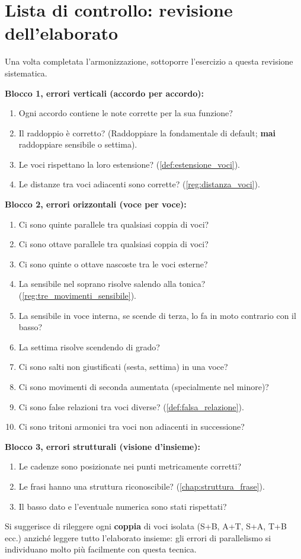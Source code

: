 \section{Lista di controllo: revisione dell'elaborato}

\begin{regola}
\label{reg:checklist_errori}
Una volta completata l'armonizzazione, sottoporre l'esercizio a questa revisione sistematica.

\textbf{Blocco 1, errori verticali (accordo per accordo):}
\begin{enumerate}
	\item Ogni accordo contiene le note corrette per la sua funzione?
	\item Il raddoppio è corretto? (Raddoppiare la fondamentale di default; \textbf{mai} raddoppiare sensibile o settima).
	\item Le voci rispettano la loro estensione? (\ref{def:estensione_voci}).
	\item Le distanze tra voci adiacenti sono corrette? (\ref{reg:distanza_voci}).
\end{enumerate}

\textbf{Blocco 2, errori orizzontali (voce per voce):}
\begin{enumerate}
	\item Ci sono quinte parallele tra qualsiasi coppia di voci?
	\item Ci sono ottave parallele tra qualsiasi coppia di voci?
	\item Ci sono quinte o ottave nascoste tra le voci esterne?
	\item La sensibile nel soprano risolve salendo alla tonica? (\ref{reg:tre_movimenti_sensibile}).
	\item La sensibile in voce interna, se scende di terza, lo fa in moto contrario con il basso?
	\item La settima risolve scendendo di grado?
	\item Ci sono salti non giustificati (sesta, settima) in una voce?
	\item Ci sono movimenti di seconda aumentata (specialmente nel minore)?
	\item Ci sono false relazioni tra voci diverse? (\ref{def:falsa_relazione}).
	\item Ci sono tritoni armonici tra voci non adiacenti in successione?
\end{enumerate}

\textbf{Blocco 3, errori strutturali (visione d'insieme):}
\begin{enumerate}
	\item Le cadenze sono posizionate nei punti metricamente corretti?
	\item Le frasi hanno una struttura riconoscibile? (\ref{chap:struttura_frase}).
	\item Il basso dato e l'eventuale numerica sono stati rispettati?
\end{enumerate}
\end{regola}

Si suggerisce di rileggere ogni \textbf{coppia} di voci isolata (S+B, A+T, S+A, T+B ecc.) anziché leggere tutto l'elaborato insieme: gli errori di parallelismo si individuano molto più facilmente con questa tecnica.
